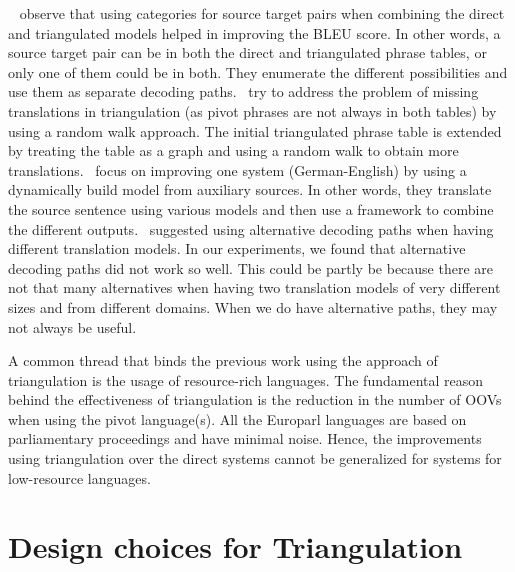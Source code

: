 \documentclass[11pt]{article}
\begin{document}
~\cite{Habash:13} observe that using categories for source target pairs when combining the direct and triangulated models helped in improving the BLEU score. In other words, a source target pair can be in both the direct and triangulated phrase tables, or only one of them could be in both. They enumerate the different possibilities and use them as separate decoding paths.~\cite{zhu:2013} try to address the problem of missing translations in triangulation (as pivot phrases are not always in both tables) by using a random walk approach. The initial triangulated phrase table is extended by treating the table as a graph and using a random walk to obtain more translations.~\cite{crego:10} focus on improving one system (German-English) by using a dynamically build model from auxiliary sources. In other words, they translate the source sentence using various models and then use a framework to combine the different outputs.~\cite{Bertoldi:08} suggested using alternative decoding paths when having different translation models. In our experiments, we found that alternative decoding paths did not work so well. This could be partly be because there are not that many alternatives when having two translation models of very different sizes and from different domains. When we do have alternative paths, they may not always be useful.  

A common thread that binds the previous work using the approach of triangulation is the usage of resource-rich languages. The fundamental reason behind the effectiveness of triangulation is the reduction in the number of OOVs when using the pivot language(s). All the Europarl languages are based on parliamentary proceedings and have minimal noise. Hence, the improvements using triangulation over the direct systems cannot be generalized for systems for low-resource languages. 

\section{Design choices for Triangulation}
\label{sec:models}
	
\end{document}
